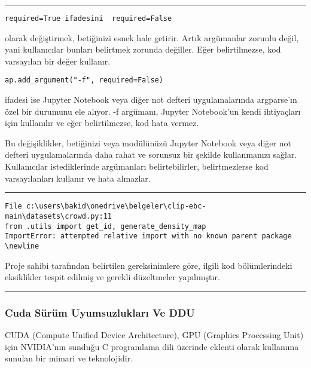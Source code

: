 \documentclass[10pt,a4paper]{report}
\begin{document}
\rule{\linewidth}{0.65pt}
\begin{verbatim}
required=True ifadesini  required=False\end{verbatim} olarak değiştirmek, betiğinizi esnek hale getirir. Artık argümanlar zorunlu değil, yani kullanıcılar bunları belirtmek zorunda değiller. Eğer belirtilmezse, kod varsayılan bir değer kullanır.

\begin{verbatim}
ap.add_argument("-f", required=False)	\end{verbatim}
\begin{justify}
ifadesi ise Jupyter Notebook veya diğer not defteri uygulamalarında argparse'ın özel bir durumunu ele alıyor. -f argümanı, Jupyter Notebook'un kendi ihtiyaçları için kullanılır ve eğer belirtilmezse, kod hata vermez.\newline


Bu değişiklikler, betiğinizi veya modülünüzü Jupyter Notebook veya diğer not defteri uygulamalarında daha rahat ve sorunsuz bir şekilde kullanmanızı sağlar. Kullanıcılar istediklerinde argümanları belirtebilirler, belirtmezlerse kod varsayılanları kullanır ve hata almazlar\cite{CB_Acnt}.
\end{justify}
\rule{\linewidth}{0.65pt}

\begin{verbatim}
File c:\users\bakid\onedrive\belgeler\clip-ebc-main\datasets\crowd.py:11
from .utils import get_id, generate_density_map	
ImportError: attempted relative import with no known parent package \newline
\end{verbatim}
\begin{justify}
	Proje sahibi tarafından belirtilen gereksinimlere göre, ilgili kod bölümlerindeki eksiklikler tespit edilmiş ve gerekli düzeltmeler yapılmıştır.
\end{justify}
\rule{\linewidth}{0.65pt}

	\subsubsection{Cuda Sürüm Uyumsuzlukları Ve DDU}

\begin{justify}
	CUDA (Compute Unified Device Architecture), GPU (Graphics Processing Unit) için NVIDIA'nın sunduğu C programlama dili üzerinde eklenti olarak kullanıma sunulan bir mimari ve teknolojidir\cite{wiki:CUDA}.
\end{justify}	
	
\end{document}
